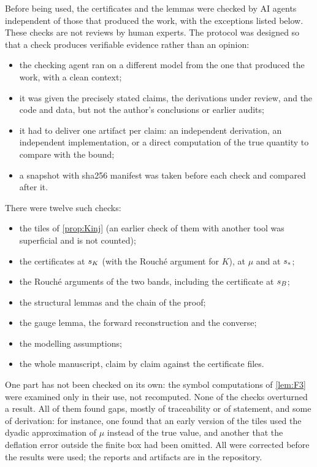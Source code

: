 Before being used, the certificates and the lemmas were checked by AI agents independent of those that produced the
work, with the exceptions listed below. These checks are not reviews by human experts. The protocol was designed so
that a check produces verifiable evidence rather than an opinion:
\begin{itemize}[leftmargin=*]
\item the checking agent ran on a different model from the one that produced the work, with a clean context;
\item it was given the precisely stated claims, the derivations under review, and the code and data, but not
  the author's conclusions or earlier audits;
\item it had to deliver one artifact per claim: an independent derivation, an independent implementation, or a
  direct computation of the true quantity to compare with the bound;
\item a snapshot with sha256 manifest was taken before each check and compared after it.
\end{itemize}
There were twelve such checks:
\begin{itemize}[leftmargin=*]
\item the tiles of \cref{prop:Kinj} (an earlier check of them with another tool was superficial and is not
  counted);
\item the certificates at $s_{K}$ (with the Rouch\'e argument for $K$), at $\mu$ and at $s_{\ast}$;
\item the Rouch\'e arguments of the two bands, including the certificate at $s_{B}$;
\item the structural lemmas and the chain of the proof;
\item the gauge lemma, the forward reconstruction and the converse;
\item the modelling assumptions;
\item the whole manuscript, claim by claim against the certificate files.
\end{itemize}
One part has not been checked on its own: the symbol computations of \cref{lem:F3} were examined only in their use,
not recomputed. None of the checks overturned a result. All of them found gaps, mostly of traceability or of statement,
and some of derivation: for instance, one found that an early version of the tiles used the dyadic approximation of
$\mu$ instead of the true value, and another that the deflation error outside the finite box had been omitted. All
were corrected before the results were used; the reports and artifacts are in the repository.


